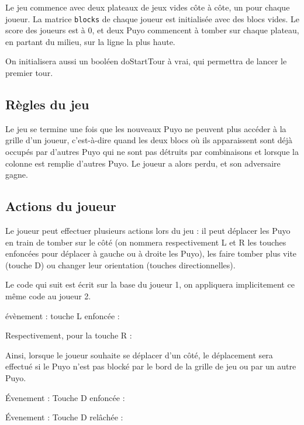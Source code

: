 \documentclass[11pt, final]{report}
\renewcommand{\tt}[1]{\texttt{#1}}
\begin{document}


Le jeu commence avec deux plateaux de jeux vides côte à côte, un pour chaque joueur. La matrice \tt{blocks} de chaque joueur est initialisée avec des blocs vides. Le score des joueurs est à 0, et deux Puyo commencent à tomber sur chaque plateau, en partant du milieu, sur la ligne la plus haute. 

On initialisera aussi un booléen doStartTour à vrai, qui permettra de lancer le premier tour.
\\

\subsection{Règles du jeu}

Le jeu se termine une fois que les nouveaux Puyo ne peuvent plus accéder à la grille d'un joueur, c'est-à-dire quand les deux blocs où ils apparaissent sont déjà occupés par d'autres Puyo qui ne sont pas détruits par combinaisons et lorsque la colonne est remplie d'autres Puyo. Le joueur a alors perdu, et son adversaire gagne. 

\subsection{Actions du joueur}
Le joueur peut effectuer plusieurs actions lors du jeu : il peut déplacer les Puyo en train de tomber sur le côté (on nommera respectivement L et R les touches enfoncées pour déplacer à gauche ou à droite les Puyo), les faire tomber plus vite (touche D) ou changer leur orientation (touches directionnelles). 

Le code 	qui suit est écrit sur la base du joueur 1, on appliquera implicitement ce même code au joueur 2. 

évènement : touche L enfoncée :


Respectivement, pour la touche R : 


Ainsi, lorsque le joueur souhaite se déplacer d'un côté, le déplacement sera effectué si le Puyo n'est pas blocké par le bord de la grille de jeu ou par un autre Puyo. 

Évenement : Touche D enfoncée : 


Évenement : Touche D relâchée : 

\end{document}
